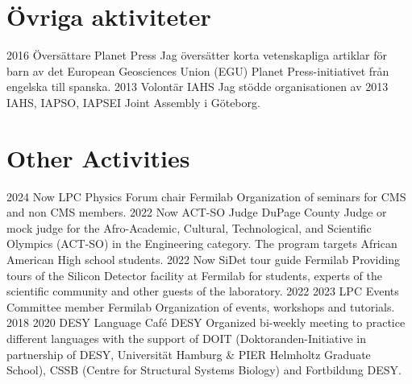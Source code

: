 \ifswedish
  \section{Övriga aktiviteter}
    \position
      {2016 \textemdash{}}
      {Översättare}
      {Planet Press}
      {Jag översätter korta vetenskapliga artiklar för barn av det European Geosciences Union (EGU) Planet Press-initiativet från engelska till spanska.}
    \position
      {2013}
      {Volontär}
      {IAHS}
      {Jag stödde organisationen av 2013 IAHS, IAPSO, IAPSEI Joint Assembly i Göteborg.}
\else
  \section{Other Activities}
    \position
      {2024 \textemdash{} Now} 
      {LPC Physics Forum chair}
      {Fermilab}
      {Organization of seminars for CMS and non CMS members.}
     \position
      {2022 \textemdash{} Now} 
      {ACT-SO Judge}
      {DuPage County}
      {Judge or mock judge for the Afro-Academic, Cultural, Technological, and Scientific Olympics (ACT-SO) in the Engineering category. The program targets African American High school students.}
     \position
      {2022 \textemdash{} Now} 
      {SiDet tour guide}
      {Fermilab}
      {Providing tours of the Silicon Detector facility at Fermilab for students, experts of the scientific community and other guests of the laboratory.}
      \position
      {2022 \textemdash{} 2023} 
      {LPC Events Committee member}
      {Fermilab}
      {Organization of events, workshops and tutorials.}
    \position
      {2018 \textemdash{} 2020} 
      {DESY Language Café}
      {DESY}
      {Organized bi-weekly meeting to practice different languages with the support of DOIT (Doktoranden-Initiative in partnership of DESY, Universität Hamburg \&  PIER Helmholtz Graduate School), CSSB (Centre for Structural Systems Biology) and Fortbildung DESY.}
\fi
